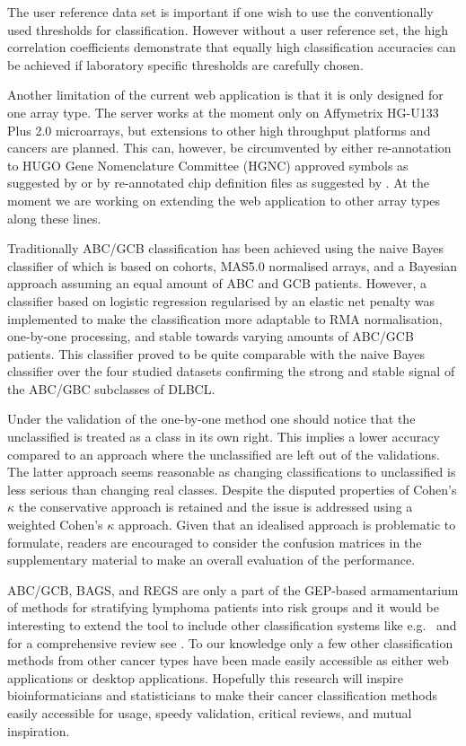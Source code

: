 \documentclass{article}
\begin{document}
The user reference data set is important if one wish to use the conventionally used thresholds for classification.
However without a user reference set, the high correlation coefficients demonstrate that equally high classification accuracies can be achieved if laboratory specific thresholds are carefully chosen.

Another limitation of the current web application is that it is only designed for one array type.
The server works at the moment only on Affymetrix HG-U133 Plus 2.0 microarrays, but extensions to other high throughput platforms and cancers are planned.
This can, however, be circumvented by either re-annotation to HUGO Gene Nomenclature Committee (HGNC) approved symbols as suggested by \citet{Care2013} or by re-annotated chip definition files as suggested by \citep{Dai2005}.
At the moment we are working on extending the web application to other array types along these lines.

Traditionally ABC/GCB classification has been achieved using the naive Bayes classifier of \citet{Wright2003} which is based on cohorts, MAS5.0 normalised arrays, and a Bayesian approach assuming an equal amount of ABC and GCB patients.
However, a classifier based on logistic regression regularised by an elastic net penalty was implemented to make the classification more adaptable to RMA normalisation, one-by-one processing, and stable towards varying amounts of ABC/GCB patients.
This classifier proved to be quite comparable with the naive Bayes classifier over the four studied datasets confirming the strong and stable signal of the ABC/GBC subclasses of DLBCL.

Under the validation of the one-by-one method one should notice that the unclassified is treated as a class in its own right.
This implies a lower accuracy compared to an approach where the unclassified are left out of the validations.
The latter approach seems reasonable as changing classifications to unclassified is less serious than changing real classes.
Despite the disputed properties of Cohen's $\kappa$ the conservative approach is retained and the issue is addressed using a weighted Cohen's $\kappa$ approach.
Given that an idealised approach is problematic to formulate, readers are encouraged to consider the confusion matrices in the supplementary material to make an overall evaluation of the performance.

ABC/GCB, BAGS, and REGS are only a part of the GEP-based armamentarium of methods for stratifying lymphoma patients into risk groups and it would be interesting to extend the tool to include other classification systems like e.g.\ \citep{Shipp2002, Lossos2004a, Malumbres2008} and for a comprehensive review see \citep{Coutinho2013}.
To our knowledge only a few other classification methods from other cancer types have been made easily accessible as either web applications or desktop applications.
Hopefully this research will inspire bioinformaticians and statisticians to make their cancer classification methods easily accessible for usage, speedy validation, critical reviews, and mutual inspiration.
\end{document}
